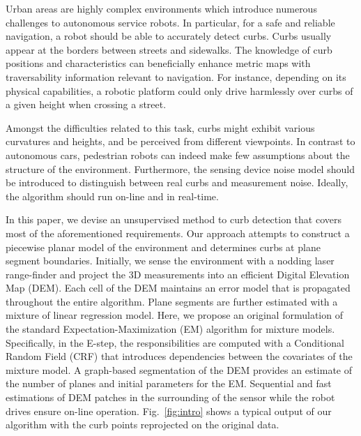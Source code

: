 Urban areas are highly complex environments which introduce numerous challenges
to autonomous service robots. In particular, for a safe and reliable navigation,
a robot should be able to accurately detect curbs. Curbs usually appear at the
borders between streets and sidewalks. The knowledge of curb positions and
characteristics can beneficially enhance metric maps with traversability
information relevant to navigation. For instance, depending on its physical
capabilities, a robotic platform could only drive harmlessly over curbs of a
given height when crossing a street.

Amongst the difficulties related to this task, curbs might exhibit various
curvatures and heights, and be perceived from different viewpoints. In contrast
to autonomous cars, pedestrian robots can indeed make few assumptions about
the structure of the environment. Furthermore, the sensing device noise model
should be introduced to distinguish between real curbs and measurement noise.
Ideally, the algorithm should run on-line and in real-time.

In this paper, we devise an unsupervised method to curb detection that covers
most of the aforementioned requirements. Our approach attempts to construct a
piecewise planar model of the environment and determines curbs at plane segment
boundaries. Initially, we sense the environment with a nodding laser
range-finder and project the 3D measurements into an efficient Digital Elevation
Map (DEM). Each cell of the DEM maintains an error model that is propagated
throughout the entire algorithm. Plane segments are further estimated with a
mixture of linear regression model. Here, we propose an original formulation of
the standard Expectation-Maximization (EM) algorithm for mixture models.
Specifically, in the E-step, the responsibilities are computed with a
Conditional Random Field (CRF) that introduces dependencies between the
covariates of the mixture model. A graph-based segmentation of the DEM provides
an estimate of the number of planes and initial parameters for the EM.
Sequential and fast estimations of DEM patches in the surrounding of the sensor
while the robot drives ensure on-line operation. Fig.~\ref{fig:intro} shows a
typical output of our algorithm with the curb points reprojected on the original
data.

